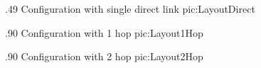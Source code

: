         {.49\columnwidth}
        {Configuration with single direct link}
        {pic:LayoutDirect}

        {.90\columnwidth}
        {Configuration with 1 hop}
        {pic:Layout1Hop}

        {.90\columnwidth}
        {Configuration with 2 hop}
        {pic:Layout2Hop}

\begin{multicols}{2}

\end{multicols}


